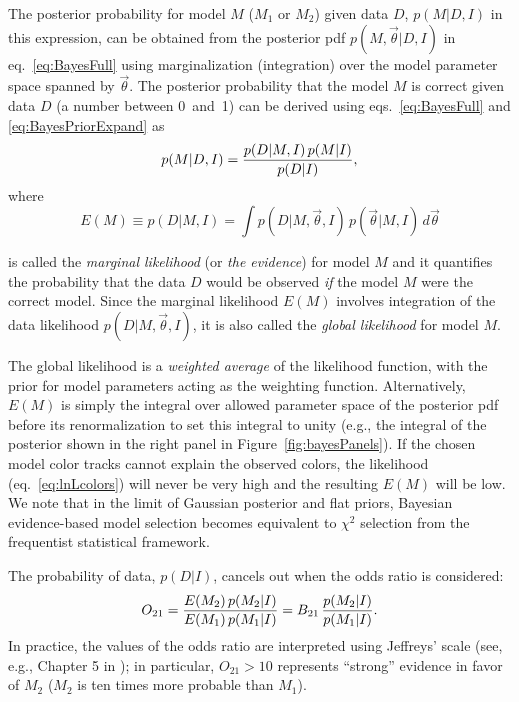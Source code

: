 The posterior probability for model $M$ ($M_1$ or $M_2$) given data $D$, $p(M|D,I)$  in this
expression, can be obtained from the posterior pdf $p(M,\vec{\theta}|D,I)$ in eq.~\ref{eq:BayesFull}
using marginalization (integration) over the model parameter space spanned by $\vec{\theta}$.
The posterior probability that the model $M$ is correct given data $D$ (a number between 0~and~1)
can be derived using eqs.~\ref{eq:BayesFull} and \ref{eq:BayesPriorExpand} as
\begin{equation}
             p(M|D,I) =  {p(D|M,I) \, p(M|I) \over p(D|I)},
\end{equation}           
where
\begin{equation}
\label{eq:evidence}
       E(M) \equiv p(D|M,I) = \int p(D|M,\vec{\theta},I) \, p(\vec{\theta}|M,I) \, d \vec{\theta}
\end{equation}
     
is called the {\it marginal likelihood} (or {\it the evidence}) for model $M$ and it quantifies the 
probability that the data $D$ would be observed {\it if} the model $M$ were the correct model.
Since the marginal likelihood $E(M)$ involves integration of the data likelihood $p(D|M,\vec{\theta},I)$,
it is also called the {\it global likelihood} for model $M$.

The global likelihood is a {\it weighted average} of the likelihood function, with the prior for model parameters
acting as the weighting function. Alternatively, $E(M)$ is simply the integral over allowed parameter space of
the posterior pdf before its renormalization to set this integral to unity (e.g., the integral of the posterior shown
in the right panel in Figure~\ref{fig:bayesPanels}). If the chosen model color tracks cannot explain the observed
colors, the likelihood (eq.~\ref{eq:lnLcolors}) will never be very high and the resulting $E(M)$ will be low.
We note that in the limit of Gaussian posterior and flat priors, Bayesian evidence-based model selection becomes
equivalent to $\chi^2$ selection from the frequentist statistical framework. 

The probability of data, $p(D|I)$, cancels out when the odds ratio is considered: 
\begin{equation}
       O_{21} =  {E(M_2) \, p(M_2|I) \over E(M_1) \, p(M_1|I)} =
       B_{21} \, {p(M_2|I) \over p(M_1|I)}. 
\end{equation}
In practice, the values of the odds ratio are interpreted using Jeffreys' scale (see, e.g., Chapter 5 in \citealt{2020sdmm.book.....I});
in particular, $O_{21}>10$ represents ``strong'' evidence in favor of $M_2$ ($M_2$ is ten times more probable than $M_1$).
     
